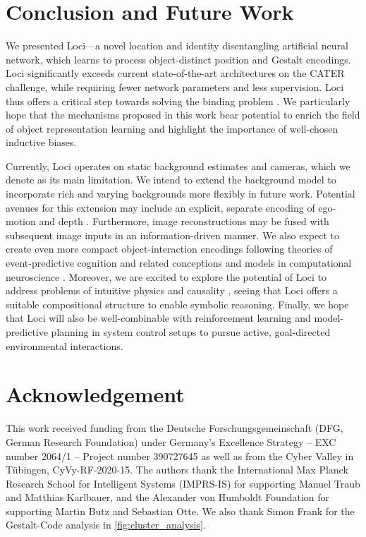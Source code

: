 \documentclass{article} \usepackage{iclr2023_conference_arxiv,times}
\begin{document}
\section{Conclusion and Future Work}

We presented Loci---a novel location and identity disentangling artificial neural network, which learns to process object-distinct position and Gestalt encodings. 
Loci significantly exceeds current state-of-the-art architectures on the CATER challenge, while requiring fewer network parameters and less supervision. 
Loci thus offers a critical step towards solving the binding problem \cite{greff2020binding,Treisman:1996,Malsburg:1995}.
We particularly hope that the mechanisms proposed in this work bear potential to enrich the field of object representation learning and highlight the importance of well-chosen inductive biases.


Currently, Loci operates on static background estimates and cameras, which we denote as its main limitation. 
We intend to extend the background model to incorporate rich and varying backgrounds more flexibly in future work. Potential avenues for this extension may include an explicit, separate encoding of ego-motion and depth \citep{Li:2021}.
Furthermore, image reconstructions may be fused with subsequent image inputs in an information-driven manner.  
We also expect to create even more compact object-interaction encodings following theories of event-predictive cognition and related conceptions and models in computational neuroscience \citep{Butz:2016,Butz:2021,Franklin:2020,Stawarczyk:2021}.
Moreover, we are excited to explore the potential of Loci to address problems of intuitive physics and causality \citep{Michotte:1946,Pearl:2018,Schoelkopf:2021}, seeing that Loci offers a suitable compositional structure \citep{greff2020binding,Lake:2017} to enable symbolic reasoning. 
Finally, we hope that Loci will also be well-combinable with reinforcement learning and model-predictive planning in system control setups to pursue active, goal-directed environmental interactions. 

\section{Acknowledgement}
This work received funding from the Deutsche Forschungsgemeinschaft (DFG, German Research Foundation) under Germany’s Excellence Strategy – EXC number 2064/1 – Project number 390727645 as well as from the Cyber Valley in Tübingen, CyVy-RF-2020-15. The authors thank the International Max Planck Research School for Intelligent Systems (IMPRS-IS) for supporting Manuel Traub and Matthias Karlbauer, and the Alexander von Humboldt Foundation for supporting Martin Butz and Sebastian Otte. We also thank Simon Frank for the Gestalt-Code analysis in \autoref{fig:cluster_analysis}.
\end{document}

